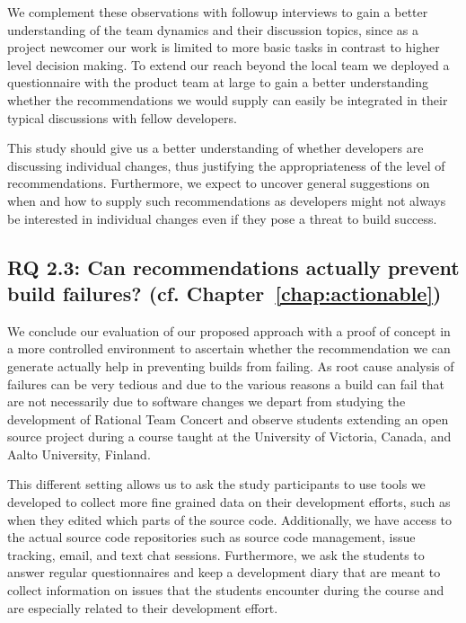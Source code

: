 We complement these observations with followup interviews to gain a better understanding of the team dynamics and their discussion topics, since as a project newcomer our work is limited to more basic tasks in contrast to higher level decision making.
To extend our reach beyond the local team we deployed a questionnaire with the product team at large to gain a better understanding whether the recommendations we would supply can easily be integrated in their typical discussions with fellow developers.

This study should give us a better understanding of whether developers are discussing individual changes, thus justifying the appropriateness of the level of recommendations.
Furthermore, we expect to uncover general suggestions on when and how to supply such recommendations as developers might not always be interested in individual changes even if they pose a threat to build success.

\subsection{%
  RQ 2.3: Can recommendations actually prevent build failures? (cf. Chapter~\ref{chap:actionable})}
We conclude our evaluation of our proposed approach with  a proof of concept in a more controlled environment to ascertain whether the recommendation we can generate actually help in preventing builds from failing.
As root cause analysis of failures can be very tedious and due to the various reasons a build can fail that are not necessarily due to software changes we depart from studying the development of Rational Team Concert and observe students extending an open source project during a course taught at the University of Victoria, Canada, and Aalto University, Finland.

This different setting allows us to ask the study participants to use tools we developed to collect more fine grained data on their development efforts, such as when they edited which parts of the source code.
Additionally, we have access to the actual source code repositories such as source code management, issue tracking, email, and text chat sessions.
Furthermore, we ask the students to answer regular questionnaires and keep a development diary that are meant to collect information on issues that the students encounter during the course and are especially related to their development effort.

